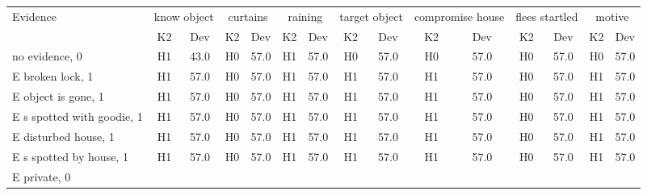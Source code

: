 \begin{table}\begin{tabular}{l|cc|cc|cc|cc|cc|cc|cc}\toprule\multirow{2}{*}{Evidence} & \multicolumn{2}{c}{know object}& \multicolumn{2}{c}{curtains}& \multicolumn{2}{c}{raining}& \multicolumn{2}{c}{target object}& \multicolumn{2}{c}{compromise house}& \multicolumn{2}{c}{flees startled}& \multicolumn{2}{c}{motive}\\& {K2} & {Dev}& {K2} & {Dev}& {K2} & {Dev}& {K2} & {Dev}& {K2} & {Dev}& {K2} & {Dev}& {K2} & {Dev}\\\midrule
no evidence, 0 & \cellcolor{Bittersweet}H1&\cellcolor{Bittersweet}43.0&\cellcolor{Bittersweet}H0&\cellcolor{Bittersweet}57.0&\cellcolor{Bittersweet}H1&\cellcolor{Bittersweet}57.0&\cellcolor{Bittersweet}H0&\cellcolor{Bittersweet}57.0&\cellcolor{Bittersweet}H0&\cellcolor{Bittersweet}57.0&\cellcolor{Bittersweet}H0&\cellcolor{Bittersweet}57.0&\cellcolor{Bittersweet}H0&\cellcolor{Bittersweet}57.0\\E broken lock, 1 & \cellcolor{Bittersweet}H1&\cellcolor{Bittersweet}57.0&\cellcolor{Bittersweet}H0&\cellcolor{Bittersweet}57.0&\cellcolor{Bittersweet}H1&\cellcolor{Bittersweet}57.0&\cellcolor{Bittersweet}H1&\cellcolor{Bittersweet}57.0&\cellcolor{Bittersweet}H1&\cellcolor{Bittersweet}57.0&\cellcolor{Bittersweet}H0&\cellcolor{Bittersweet}57.0&\cellcolor{Bittersweet}H1&\cellcolor{Bittersweet}57.0\\E object is gone, 1 & \cellcolor{Bittersweet}H1&\cellcolor{Bittersweet}57.0&\cellcolor{Bittersweet}H0&\cellcolor{Bittersweet}57.0&\cellcolor{Bittersweet}H1&\cellcolor{Bittersweet}57.0&\cellcolor{Bittersweet}H1&\cellcolor{Bittersweet}57.0&\cellcolor{Bittersweet}H1&\cellcolor{Bittersweet}57.0&\cellcolor{Bittersweet}H0&\cellcolor{Bittersweet}57.0&\cellcolor{Bittersweet}H1&\cellcolor{Bittersweet}57.0\\E s spotted with goodie, 1 & \cellcolor{Bittersweet}H1&\cellcolor{Bittersweet}57.0&\cellcolor{Bittersweet}H0&\cellcolor{Bittersweet}57.0&\cellcolor{Bittersweet}H1&\cellcolor{Bittersweet}57.0&\cellcolor{Bittersweet}H1&\cellcolor{Bittersweet}57.0&\cellcolor{Bittersweet}H1&\cellcolor{Bittersweet}57.0&\cellcolor{Bittersweet}H0&\cellcolor{Bittersweet}57.0&\cellcolor{Bittersweet}H1&\cellcolor{Bittersweet}57.0\\E disturbed house, 1 & \cellcolor{Bittersweet}H1&\cellcolor{Bittersweet}57.0&\cellcolor{Bittersweet}H0&\cellcolor{Bittersweet}57.0&\cellcolor{Bittersweet}H1&\cellcolor{Bittersweet}57.0&\cellcolor{Bittersweet}H1&\cellcolor{Bittersweet}57.0&\cellcolor{Bittersweet}H1&\cellcolor{Bittersweet}57.0&\cellcolor{Bittersweet}H0&\cellcolor{Bittersweet}57.0&\cellcolor{Bittersweet}H1&\cellcolor{Bittersweet}57.0\\E s spotted by house, 1 & \cellcolor{Bittersweet}H1&\cellcolor{Bittersweet}57.0&\cellcolor{Bittersweet}H0&\cellcolor{Bittersweet}57.0&\cellcolor{Bittersweet}H1&\cellcolor{Bittersweet}57.0&\cellcolor{Bittersweet}H1&\cellcolor{Bittersweet}57.0&\cellcolor{Bittersweet}H1&\cellcolor{Bittersweet}57.0&\cellcolor{Bittersweet}H0&\cellcolor{Bittersweet}57.0&\cellcolor{Bittersweet}H1&\cellcolor{Bittersweet}57.0\\E private, 0 & 
\end{tabular}
\end{table}
